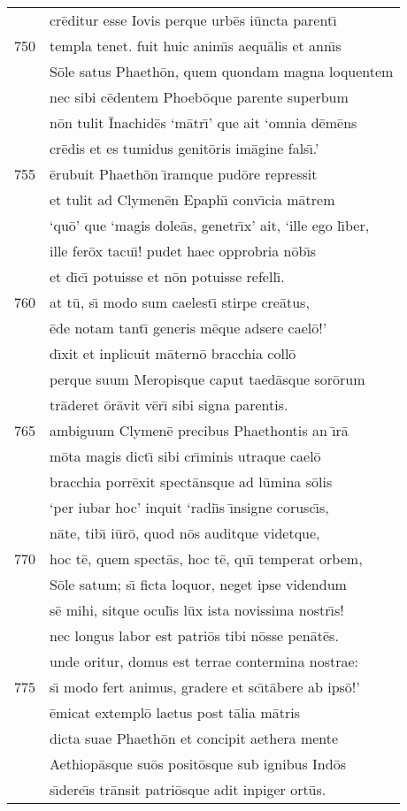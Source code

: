 \documentclass[paper=6in:9in,pagesize=pdftex,
               headinclude=on,footinclude=on,12pt]{scrbook}
\begin{document}
\begin{longtable}[p]{ r l }
 & cr\=editur esse Iovis perque urb\=es i\=uncta parent\={\i}\\ 
750 & templa tenet. fuit huic anim\={\i}s aequ\=alis et ann\={\i}s\\ 
 & S\=ole satus Phaeth\=on, quem quondam magna loquentem\\ 
 & nec sibi c\=edentem Phoeb\=oque parente superbum\\ 
 & n\=on tulit \=Inachid\=es `m\=atr\={\i}' que ait `omnia d\=em\=ens\\ 
 & cr\=edis et es tumidus genit\=oris im\=agine fals\={\i}.'\\ 
755 & \=erubuit Phaeth\=on \={\i}ramque pud\=ore repressit\\ 
 & et tulit ad Clymen\=en Epaph\={\i} conv\={\i}cia m\=atrem\\ 
 & `qu\=o' que `magis dole\=as, genetr\={\i}x' ait, `ille ego l\={\i}ber,\\ 
 & ille fer\=ox tacu\={\i}! pudet haec opprobria n\=ob\={\i}s\\ 
 & et d\={\i}c\={\i} potuisse et n\=on potuisse refell\={\i}.\\ 
760 & at t\=u, s\={\i} modo sum caelest\={\i} stirpe cre\=atus,\\ 
 & \=ede notam tant\={\i} generis m\=eque adsere cael\=o!'\\ 
 & d\={\i}xit et inplicuit m\=atern\=o bracchia coll\=o\\ 
 & perque suum Meropisque caput taed\=asque sor\=orum\\ 
 & tr\=aderet \=or\=avit v\=er\={\i} sibi signa parentis.\\ 
765 & ambiguum Clymen\=e precibus Phaethontis an \={\i}r\=a\\ 
 & m\=ota magis dict\={\i} sibi cr\={\i}minis utraque cael\=o\\ 
 & bracchia porr\=exit spect\=ansque ad l\=umina s\=olis\\ 
 & `per iubar hoc' inquit `radi\={\i}s \={\i}nsigne corusc\={\i}s,\\ 
 & n\=ate, tib\={\i} i\=ur\=o, quod n\=os auditque videtque,\\ 
770 & hoc t\=e, quem spect\=as, hoc t\=e, qu\={\i} temperat orbem,\\ 
 & S\=ole satum; s\={\i} ficta loquor, neget ipse videndum\\ 
 & s\=e mihi, sitque ocul\={\i}s l\=ux ista novissima nostr\={\i}s!\\ 
 & nec longus labor est patri\=os tibi n\=osse pen\=at\=es.\\ 
 & unde oritur, domus est terrae contermina nostrae:\\ 
775 & s\={\i} modo fert animus, gradere et sc\={\i}t\=abere ab ips\=o!'\\ 
 & \=emicat extempl\=o laetus post t\=alia m\=atris\\ 
 & dicta suae Phaeth\=on et concipit aethera mente\\ 
 & Aethiop\=asque su\=os posit\=osque sub ignibus Ind\=os\\ 
 & s\={\i}dere\={\i}s tr\=ansit patri\=osque adit inpiger ort\=us.\\ 

\end{longtable}
\end{document}
